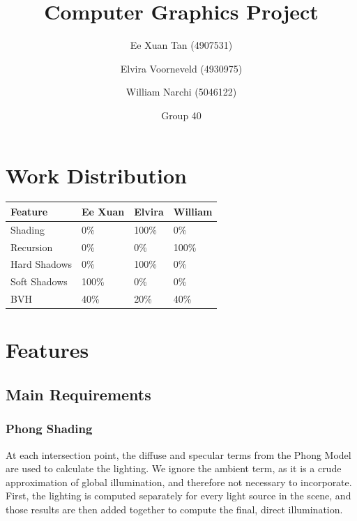 \documentclass{article}
\author{Ee Xuan Tan (4907531) \and Elvira Voorneveld (4930975) \and William Narchi (5046122)}
\date{Group 40} %
\title{Computer Graphics Project}
\begin{document}
    \maketitle

    \section{Work Distribution}
    
    \begin{tabular}{ |p{2.5cm}||p{2.5cm}|p{2.5cm}|p{2.5cm}| }
        \hline
        \textbf{Feature} &\textbf{Ee Xuan} &\textbf{Elvira} &\textbf{William}\\
        \hline
        Shading         &0\%    &100\%  &0\%\\
        Recursion       &0\%    &0\%    &100\%\\
        Hard Shadows    &0\%    &100\%  &0\%\\
        Soft Shadows    &100\%  &0\%    &0\%\\
        BVH             &40\%  &20\%    &40\%\\
        \hline
    \end{tabular}

    \section{Features}
    \subsection{Main Requirements}
    \subsubsection{Phong Shading}
    At each intersection point, the diffuse and specular terms from the Phong Model are used to calculate the lighting.
    We ignore the ambient term, as it is a crude approximation of global illumination, and therefore not necessary to incorporate.
    First, the lighting is computed separately for every light source in the scene, 
    and those results are then added together to compute the final, direct illumination.
\end{document}
